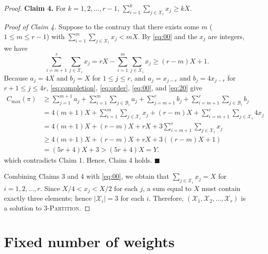 \documentclass[12pt]{article} \textheight=24.5cm \textwidth=16.5cm \parskip = 0.165cm
\let\origsection\section
\renewcommand{\section}{\FloatBarrier\origsection}
\begin{document}
\begin{sloppypar}
\begin{proof}
            \textbf{Claim 4.} For $k=1, 2, \ldots, r-1$, $\sum_{i=1}^k \sum_{j \in \mathcal{X}_i} x_j \geq kX$.
            
            \textit{Proof of Claim 4.} Suppose to the contrary that there exists some $m$ ($1 \leq m \leq r-1$) with $\sum_{i=1}^m \sum_{j \in \mathcal{X}_i} x_j < mX$.
            By \cref{eq:00} and the $x_j$ are integers, we have
            \begin{equation}\label{eq:20}
                \sum_{i=m+1}^r \sum_{j \in \mathcal{X}_i} x_j=rX-\sum_{i=1}^m \sum_{j \in \mathcal{X}_i} x_j \geq (r-m)X+1.
            \end{equation}
            Because $a_j=4X$ and $b_j=X$ for $1 \leq j \leq r$, and $a_j=x_{j-r}$ and $b_j=4 x_{j-r}$ for $r+1 \leq j \leq 4r$, \cref{eq:completion}, \cref{eq:order}, \cref{eq:00}, and \cref{eq:20} give
            \begin{align*}
                C_{\max}(\pi) & \geq \sum_{j=1}^{m+1} a_j+\sum_{i=1}^m \sum_{j \in \mathcal{B}_i} a_j+\sum_{j=m+1}^r      b_j+\sum_{i=m+1}^r \sum_{j \in \mathcal{B}_i} b_j  \nonumber \\
                &= 4(m+1)X+\sum_{i=1}^m \sum_{j \in \mathcal{X}_i} x_j +(r-m)X +\sum_{i=m+1}^r \sum_{j \in \mathcal{X}_i} 4 x_j \nonumber \\
                &= 4(m+1)X +(r-m)X + rX+ 3 \sum_{i=m+1}^r \sum_{j \in \mathcal{X}_i} x_j \\
                & \geq 4(m+1)X +(r-m)X + rX+ 3((r-m)X+1)  \nonumber \\
                & = (5r+4)X +3 > (5r+4)X = Y. \nonumber
            \end{align*}
            which contradicts Claim 1.
            Hence, Claim 4 holds.
            \hfill$\blacksquare$
            
            Combining Claims 3 and 4 with \cref{eq:00}, we obtain that $\sum_{j \in \mathcal{X}_i} x_j=X$ for $i=1, 2, \ldots, r$.
            Since $X/4 < x_j < X/2$ for each $j$, a sum equal to $X$ must contain exactly three elements; hence  $|\mathcal{X}_i|=3$ for each $i$.
            Therefore, $(\mathcal{X}_1, \mathcal{X}_2, \ldots, \mathcal{X}_r)$ is a solution to 3-\textsc{Partition}.
        \end{proof}
        
        \section{Fixed number of weights} \label{sec:dp_algorithm}
        

\end{sloppypar}
\end{document}
